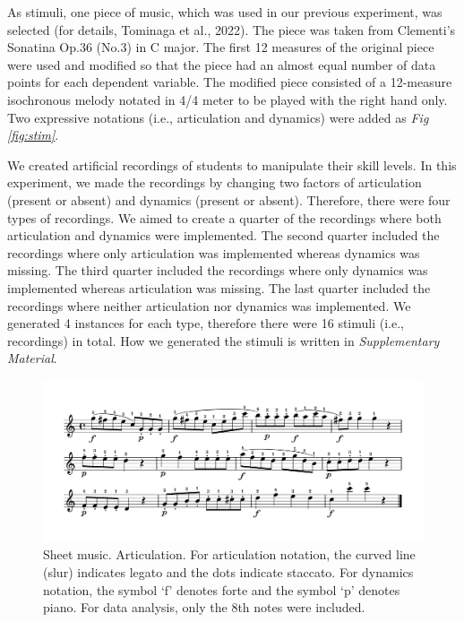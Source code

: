 \documentclass[
  man]{apa6}
\begin{document}
As stimuli, one piece of music, which was used in our previous experiment, was selected (for details, Tominaga et al., 2022). The piece was taken from Clementi's Sonatina Op.36 (No.3) in C major. The first 12 measures of the original piece were used and modified so that the piece had an almost equal number of data points for each dependent variable. The modified piece consisted of a 12-measure isochronous melody notated in 4/4 meter to be played with the right hand only. Two expressive notations (i.e., articulation and dynamics) were added as \emph{Fig \ref{fig:stim}}.

We created artificial recordings of students to manipulate their skill levels. In this experiment, we made the recordings by changing two factors of articulation (present or absent) and dynamics (present or absent). Therefore, there were four types of recordings. We aimed to create a quarter of the recordings where both articulation and dynamics were implemented. The second quarter included the recordings where only articulation was implemented whereas dynamics was missing. The third quarter included the recordings where only dynamics was implemented whereas articulation was missing. The last quarter included the recordings where neither articulation nor dynamics was implemented. We generated 4 instances for each type, therefore there were 16 stimuli (i.e., recordings) in total. How we generated the stimuli is written in \emph{Supplementary Material}.

\begin{figure}
\includegraphics[width=1\linewidth]{manuscript_files/figure-latex/stimli-1} \caption{\label{fig:stim}Sheet music. Articulation. For articulation notation, the curved line (slur) indicates legato and the dots indicate staccato. For dynamics notation, the symbol `f' denotes forte and the symbol `p' denotes piano. For data analysis, only the 8th notes were included.}\label{fig:stimli}
\end{figure}
\end{document}
